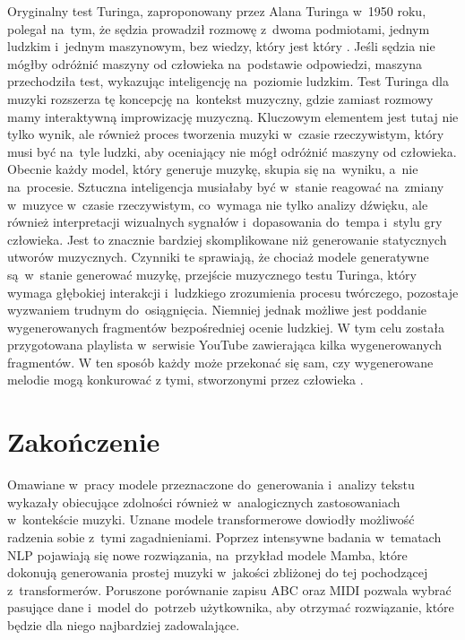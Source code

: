 \documentclass[data-science]{agh-wi} %
\begin{document}
Oryginalny test Turinga, zaproponowany przez Alana Turinga w~1950 roku, polegał na~tym, że sędzia prowadził rozmowę z~dwoma podmiotami, jednym ludzkim i~jednym maszynowym, bez wiedzy, który jest który \cite{turing_test}. Jeśli sędzia nie mógłby odróżnić maszyny od człowieka na~podstawie odpowiedzi, maszyna przechodziła test, wykazując inteligencję na~poziomie ludzkim. Test Turinga dla muzyki rozszerza tę koncepcję na~kontekst muzyczny, gdzie zamiast rozmowy mamy interaktywną improwizację muzyczną. Kluczowym elementem jest tutaj nie tylko wynik, ale również proces tworzenia muzyki w~czasie rzeczywistym, który musi być na~tyle ludzki, aby oceniający nie mógł odróżnić maszyny od człowieka. Obecnie każdy model, który generuje muzykę, skupia się na~wyniku, a~nie na~procesie. Sztuczna inteligencja musiałaby być w~stanie reagować na~zmiany w~muzyce w~czasie rzeczywistym, co~wymaga nie tylko analizy dźwięku, ale również interpretacji wizualnych sygnałów i~dopasowania do~tempa i~stylu gry człowieka. Jest to znacznie bardziej skomplikowane niż generowanie statycznych utworów muzycznych. Czynniki te sprawiają, że chociaż modele generatywne są~w~stanie generować muzykę, przejście muzycznego testu Turinga, który wymaga głębokiej interakcji i~ludzkiego zrozumienia procesu twórczego, pozostaje wyzwaniem trudnym do~osiągnięcia. Niemniej jednak możliwe jest poddanie wygenerowanych fragmentów bezpośredniej ocenie ludzkiej. W tym celu została przygotowana playlista w~serwisie YouTube zawierająca kilka wygenerowanych fragmentów. W ten sposób każdy może przekonać się sam, czy wygenerowane melodie mogą konkurować z tymi, stworzonymi przez człowieka \cite*{playlist}.

\chapter{Zakończenie}

Omawiane w~pracy modele przeznaczone do~generowania i~analizy tekstu wykazały obiecujące zdolności również w~analogicznych zastosowaniach w~kontekście muzyki. Uznane modele transformerowe dowiodły możliwość radzenia sobie z~tymi zagadnieniami. Poprzez intensywne badania w~tematach NLP pojawiają się nowe rozwiązania, na~przykład modele Mamba, które dokonują generowania prostej muzyki w~jakości zbliżonej do tej pochodzącej z~transformerów. Poruszone porównanie zapisu ABC oraz MIDI pozwala wybrać pasujące dane i~model do~potrzeb użytkownika, aby otrzymać rozwiązanie, które będzie dla niego najbardziej zadowalające.
\end{document}
